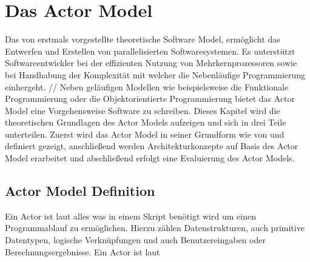 \chapter{Das Actor Model}
Das von \cite{hewitt1973session} erstmals vorgestellte theoretische Software Model, ermöglicht das Entwerfen und Erstellen von parallelisierten Softwaresystemen. Es unterstützt Softwareentwickler bei der effizienten Nutzung von Mehrkernprozessoren sowie bei Handhabung der  Komplexität mit welcher die Nebenläufige Programmierung einhergeht.   //
Neben geläufigen Modellen wie beispielsweise die Funktionale Programmierung oder die Objektorientierte Programmierung bietet das Actor Model eine Vorgehensweise Software zu schreiben. Dieses Kapitel wird die theoretischen Grundlagen des Actor Models aufzeigen und sich in drei Teile unterteilen. Zuerst wird das Actor Model in seiner Grundform wie von \cite{hewitt1973session} und \cite{Agha1985ActorsSystems} definiert gezeigt, anschließend werden Architekturkonzepte auf Basis des Actor Model erarbeitet und abschließend erfolgt eine Evaluierung des Actor Models.

\section{Actor Model Definition}
Ein Actor ist laut \cite{hewitt1973session} alles was in einem Skript benötigt wird um einen Programmablauf zu ermöglichen. Hierzu zählen Datenstrukturen, auch primitive Datentypen, logische Verknüpfungen und auch Benutzereingaben oder Berechnungsergebnisse.   
Ein Actor ist laut \cite{hewitt1973session}
